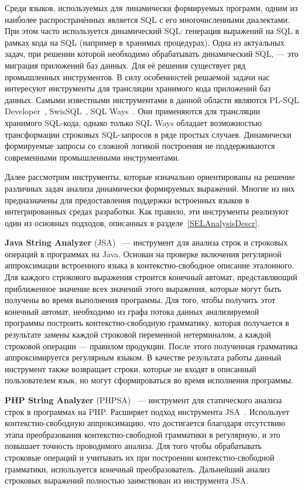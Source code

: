     Среди языков, используемых для линамически формируемых программ, одним из наиболее распространённых является SQL с его многочисленными диалектами.  При этом часто используется динамический SQL: генерация выражений на SQL в рамках кода на SQL (например в хранимых процедурах). Одна из актуальных задач, при решении которой необходимо обрабатывать динамический SQL, --- это миграция приложений баз данных. Для её решения существует ряд промышленных инструментов. В силу особенностей решаемой задачи нас интересуют инструменты для трансляции хранимого кода приложений баз данных. Самыми известными инструментами в данной области являются PL-SQL Developer~\cite{PLSQLDeveloper}, SwisSQL~\cite{SwissSQL}, SQL Ways~\cite{SQLWays}. Они применяются для трансляции хранимого SQL-кода, однако только SQL Ways обладает возможностью трансформации строковых SQL-запросов в ряде простых случаев. Динамически формируемые запросы со сложной логикой построения не поддерживаются современными промышленными инструментами.
    
    Далее рассмотрим инструменты, которые изначально ориентированы на решение различных задач анализа динамически формируемых выражений. Многие из них предназначены для предоставления поддержки встроенных языков в интегрированных средах разработки. Как правило, эти инструменты реализуют один из основных подходов, описанных в разделе~\ref{SELAnalysisDescr}.

\textbf{Java String Analyzer} (JSA)~\cite{JSA, JSAUrl} {---}  инструмент для анализа строк и строковых операций в программах на Java. Основан на проверке включения регулярной аппроксимации встроенного языка в контекстно-свободное описание эталонного. Для каждого строкового выражения строится конечный автомат, представляющий приближенное значение всех значений этого выражения, которые могут быть получены во время выполнения программы. Для того, чтобы получить этот конечный автомат, необходимо из графа потока данных анализируемой программы построить контекстно-свободную грамматику, которая получается в результате замены каждой строковой переменной нетерминалом, а каждой строковой операции {---} правилом продукции. После этого полученная грамматика аппроксимируется регулярным языком. В качестве результата работы данный инструмент также возвращает строки, которые не входят в описанный пользователем язык, но могут сформироваться во время исполнения программы. 

\textbf{PHP String Analyzer} (PHPSA)~\cite{PHPSA, PHPSAUrl} {---} инструмент для статического анализа строк в программах на PHP. Расширяет подход инструмента JSA~\cite{JSA}. Использует контекстно-свободную аппроксимацию, что достигается благодаря отсутствию этапа преобразования контекстно-свободной грамматики в регулярную, и это повышает точность проводимого анализа. Для того чтобы обрабатывать строковые операций и учитывать их при построении контекстно-свободной грамматики, используется конечный преобразователь. Дальнейший анализ строковых выражений полностью заимствован из инструмента JSA.

